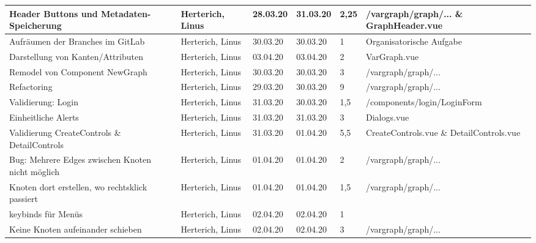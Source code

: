 \begin{longtable}{|p{4cm}|p{2cm}|p{1.2cm}|p{1.2cm}|p{0.7cm}|p{3.8cm}|}
  Header Buttons und Metadaten-Speicherung                              & Herterich, Linus      & 28.03.20 & 31.03.20 & 2,25  & /vargraph/graph/... \& GraphHeader.vue                  \\ \hline
  Aufräumen der Branches im GitLab                                      & Herterich, Linus      & 30.03.20 & 30.03.20 & 1     & Organisatorische Aufgabe  \\ \hline
  Darstellung von Kanten/Attributen                                     & Herterich, Linus      & 03.04.20 & 03.04.20 & 2     & VarGraph.vue               \\ \hline
  Remodel von Component NewGraph                                        & Herterich, Linus      & 30.03.20 & 30.03.20 & 3     & /vargraph/graph/...                   \\ \hline
  Refactoring                                                           & Herterich, Linus      & 29.03.20 & 30.03.20 & 9     & /vargraph/graph/...                                 \\ \hline
  Validierung: Login                                                    & Herterich, Linus      & 31.03.20 & 30.03.20 & 1,5   & /components/login/LoginForm                                  \\ \hline
  Einheitliche Alerts                                                   & Herterich, Linus      & 31.03.20 & 31.03.20 & 3     & Dialogs.vue \\ \hline
  Validierung CreateControls \& DetailControls                          & Herterich, Linus      & 31.03.20 & 01.04.20 & 5,5   & CreateControls.vue \& DetailControls.vue               \\ \hline
  Bug: Mehrere Edges zwischen Knoten nicht möglich                      & Herterich, Linus      & 01.04.20 & 01.04.20 & 2     & /vargraph/graph/...                   \\ \hline
  Knoten dort erstellen, wo rechtsklick passiert                        & Herterich, Linus      & 01.04.20 & 01.04.20 & 1,5   & /vargraph/graph/...                               \\ \hline
  keybinds für Menüs                                                    & Herterich, Linus      & 02.04.20 & 02.04.20 & 1     &                                   \\ \hline
  Keine Knoten aufeinander schieben                                     & Herterich, Linus      & 02.04.20 & 02.04.20 & 3     & /vargraph/graph/...  \\ \hline

\end{longtable}
